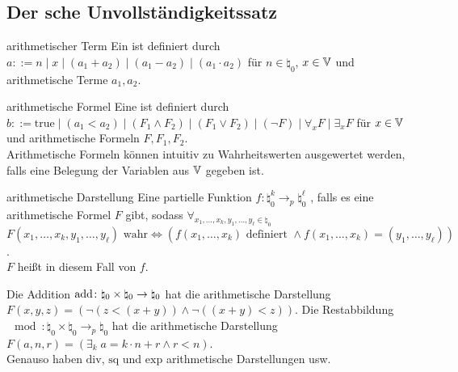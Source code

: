 \subsection{%
    Der sche Unvollständigkeitssatz%
}

\begin{Def}{arithmetischer Term}
    Ein  ist definiert durch\\
    $a ::= n \;|\; x \;|\; (a_1 + a_2) \;|\; (a_1 - a_2) \;|\; (a_1 \cdot a_2)$
    für $n \in \natural_0$, $x \in \mathbb{V}$ und arithmetische Terme $a_1, a_2$.
\end{Def}

\begin{Def}{arithmetische Formel}
    Eine  ist definiert durch\\
    $b ::= \text{true} \;|\; (a_1 < a_2) \;|\; (F_1 \land F_2) \;|\;
    (F_1 \lor F_2) \;|\; (\lnot F) \;|\; \forall_x F \;|\; \exists_x F$
    für $x \in \mathbb{V}$ und arithmetische Formeln $F, F_1, F_2$.\\
    Arithmetische Formeln können intuitiv zu Wahrheitswerten ausgewertet werden, falls eine
    Belegung der Variablen aus $\mathbb{V}$ gegeben ist.
\end{Def}

\begin{Def}{arithmetische Darstellung}
    Eine partielle Funktion $f\colon \natural_0^k \rightarrow_p \natural_0^\ell$
    , falls es eine arithmetische Formel $F$ gibt,
    sodass $\forall_{x_1, \dotsc, x_k, y_1, \dotsc, y_\ell \in \natural_0}$\\
    $F(x_1, \dotsc, x_k, y_1, \dotsc, y_\ell) \text{ wahr} \iff
    (f(x_1, \dotsc, x_k) \text{ definiert } \land
    f(x_1, \dotsc, x_k) = (y_1, \dotsc, y_\ell))$.\\
    $F$ heißt in diesem Fall  von $f$.
\end{Def}

\begin{Bsp}
    Die Addition $\text{add}\colon \natural_0 \times \natural_0 \rightarrow \natural_0$ hat die
    arithmetische Darstellung\\
    $F(x, y, z) = (\lnot(z < (x + y)) \land \lnot((x + y) < z))$.
    Die Restabbildung $\mod\colon \natural_0 \times \natural_0 \rightarrow_p \natural_0$ hat
    die arithmetische Darstellung
    $F(a, n, r) = (\exists_k\; a = k \cdot n + r \land r < n)$.\\
    Genauso haben $\text{div}$, $\text{sq}$ und $\text{exp}$ arithmetische Darstellungen usw.
\end{Bsp}

